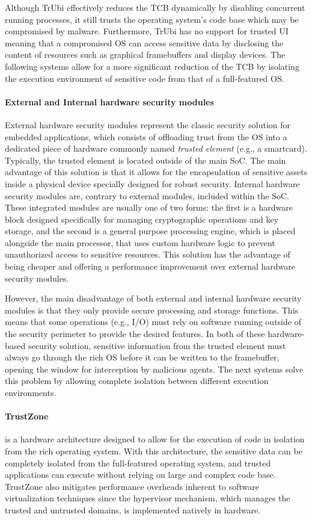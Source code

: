 Although TrUbi effectively reduces the TCB dynamically by disabling concurrent running processes, it still trusts the operating system's code base which may be compromised by malware. Furthermore, TrUbi has no support for trusted UI meaning that a compromised OS can access sensitive data by disclosing the content of resources such as graphical framebuffers and display devices. The following systems allow for a more significant reduction of the TCB by isolating the execution environment of sensitive code from that of a full-featured OS.

\paragraph{\textbf{External and Internal hardware security modules}} External hardware security modules represent the classic security solution for embedded applications, which consists of offloading trust from the OS into a dedicated piece of hardware commonly named \emph{trusted element} (e.g., a smartcard). Typically, the trusted element is located outside of the main \ac{SoC}. The main advantage of this solution is that it allows for the encapsulation of sensitive assets inside a physical device specially designed for robust security. Internal hardware security modules are, contrary to external modules, included within the \ac{SoC}. These integrated modules are usually one of two forms: the first is a hardware block designed specifically for managing cryptographic operations and key storage, and the second is a general purpose processing engine, which is placed alongside the main processor, that uses custom hardware logic to prevent unauthorized access to sensitive resources. This solution has the advantage of being cheaper and offering a performance improvement over external hardware security modules.

However, the main disadvantage of both external and internal hardware security modules is that they only provide secure processing and storage functions. This means that some operations (e.g., I/O) must rely on software running outside of the security perimeter to provide the desired features. In both of these hardware-based security solution, sensitive information from the trusted element must always go through the rich OS before it can be written to the framebuffer, opening the window for interception by malicious agents. The next systems solve this problem by allowing complete isolation between different execution environments.

\paragraph{\textbf{TrustZone}} is a hardware architecture designed to allow for the execution of code in isolation from the rich operating system. With this architecture, the sensitive data can be completely isolated from the full-featured operating system, and trusted applications can execute without relying on large and complex code base. TrustZone also mitigates performance overheads inherent to software virtualization techniques since the hypervisor mechanism, which manages the trusted and untrusted domains, is implemented natively in hardware.

